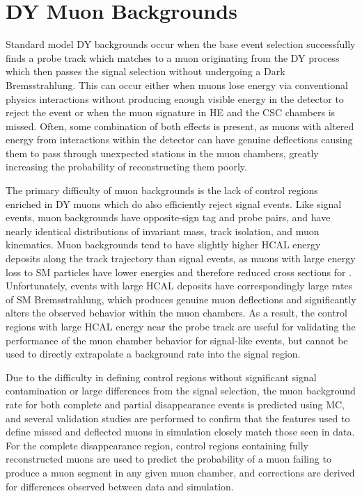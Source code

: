 \section{DY Muon Backgrounds}
Standard model DY backgrounds occur when the base event selection successfully finds a probe track which matches to a muon originating from the DY process which then passes the signal selection without undergoing a Dark Bremsstrahlung. 
This can occur either when muons lose energy via conventional physics interactions without producing enough visible energy in the detector to reject the event or when the muon signature in HE and the CSC chambers is missed.
Often, some combination of both effects is present, as muons with altered energy from interactions within the detector can have genuine deflections causing them to pass through unexpected stations in the muon chambers, greatly increasing the probability of reconstructing them poorly.

The primary difficulty of muon backgrounds is the lack of control regions enriched in DY muons which do also efficiently reject signal events.
Like signal events, muon backgrounds have opposite-sign tag and probe pairs, and have nearly identical distributions of invariant mass, track isolation, and muon kinematics.
Muon backgrounds tend to have slightly higher HCAL energy deposits along the track trajectory than signal events, as muons with large energy loss to SM particles have lower energies and therefore reduced cross sections for \dbrem.
Unfortunately, events with large HCAL deposits have correspondingly large rates of SM Bremsstrahlung, which produces genuine muon deflections and significantly alters the observed behavior within the muon chambers.
As a result, the control regions with large HCAL energy near the probe track are useful for validating the performance of the muon chamber behavior for signal-like events, but cannot be used to directly extrapolate a background rate into the signal region. 

Due to the difficulty in defining control regions without significant signal contamination or large differences from the signal selection, the muon background rate for both complete and partial disappearance events is predicted using MC, and several validation studies are performed to confirm that the features used to define missed and deflected muons in simulation closely match those seen in data.
For the complete disappearance region, control regions containing fully reconstructed muons are used to predict the probability of a muon failing to produce a muon segment in any given muon chamber, and corrections are derived for differences observed between data and simulation.

